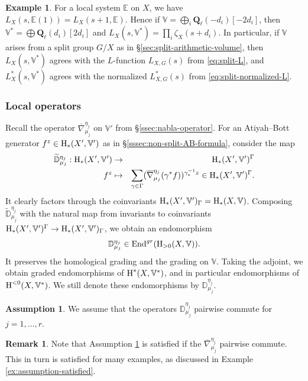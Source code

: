 \documentclass[reqno]{amsart}
\numberwithin{equation}{subsection}
\theoremstyle{definition}
\newtheorem{remark}[subsubsection]{Remark}
\newtheorem{exam}[subsubsection]{Example}
\newtheorem{assumption}[subsubsection]{Assumption}
\def\DD{\mathbb{D}}
\def\EE{\mathbb{E}}
\def\VV{\mathbb{V}}
\newcommand\End{\textup{End}}
\newcommand{\Ql}{\Q_{\ell}}
\newcommand{\wt}[1]{\widetilde{#1}}
\newcommand{\ov}{\overline}
\newcommand{\homog}[2]{\textup{H}_{#1}({#2})}  %
\newcommand{\cohog}[2]{\textup{H}^{#1}({#2})}     %
\newcommand\mt{\mapsto}
\newcommand\g\gamma
\newcommand\G\Gamma
\newcommand{\y}{\eta}
\newcommand\nb{\nabla}
\newcommand{\Q}{\mathbf{Q}}
\begin{document}
\begin{exam}
For a local system $\EE$ on $X$, we have $L_X(s, \EE(1))  = L_X(s+1, \EE)$. Hence if $\VV = \bigoplus_i \Ql(-d_i)[-2d_i]$, then $\VV^* = \bigoplus \Ql(d_i)[2d_i]$ and $L_X(s, \VV^*) = \prod_{i} \zeta_X(s+d_i)$. In particular, if $\VV$ arises from a split group $G/X$ as in \S \ref{sec:split-arithmetic-volume}, then $L_X(s, \VV^*)$ agrees with the $L$-function $L_{X,G}(s)$ from \eqref{eq:split-L}, and $L_X^*(s, \VV^*)$ agrees with the normalized $L^*_{X,G}(s)$ from \eqref{eq:split-normalized-L}.
\end{exam}

\subsubsection{Local operators}
Recall the operator $\ov\nb_{\mu_j}^{\y_{j}}$ on $\VV'$ from \S \ref{ssec:nabla-operator}. For an Atiyah--Bott generator $f^{z}\in \homog{*}{X',\VV'}$ as in \S \ref{sssec:non-split-AB-formula}, consider the map
\begin{eqnarray*}
\wt\DD^{\y_{j}}_{\mu_j}: \homog{*}{X',\VV'}
&\to& \homog{*}{X',\VV'}^{\G} \\
f^{z} & \mt &\sum_{\g\in \G} (\ov\nb^{\y_{j}}_{\mu_j}(\g^{*} f))^{\g^{-1}_{*}z} 
\in \homog{*}{X',\VV'}^{\G}.
\end{eqnarray*}
It clearly factors through the coinvariants $\homog{*}{X',\VV'}_{\G}=\homog{*}{X, \VV}$.  Composing $\wt\DD^{\y_{j}}_{\mu_j}$ with the natural map from invariants to coinvariants  $\homog{*}{X',\VV'}^{\G}\to \homog{*}{X',\VV'}_{\G}$, we obtain an endomorphism
\begin{equation*}
\DD^{\y_{j}}_{\mu_j}\in \End^{gr}(\homog{>0}{X,\VV}).
\end{equation*}
It preserves the homological grading and the grading on $\VV$. Taking the adjoint, we obtain graded endomorphisms of $\cohog{*}{X,\VV^{*}}$, and in particular endomorphisms of $\cohog{<0}{X,\VV^{*}}$. We still denote these endomorphisms by $\DD^{\y_{j}}_{\mu_j}$.

\begin{assumption}\label{assump:nonsplit-operators-commute}
We assume that the operators $\DD^{\y_{j}}_{\mu_j}$ pairwise commute for $j=1, \ldots, r$. 
\end{assumption}

\begin{remark}Note that Assumption \ref{assump:nonsplit-operators-commute} is satisfied if the $\ov \nabla^{\eta_j}_{\mu_j}$ pairwise commute. This in turn is satisfied for many examples, as discussed in Example \ref{ex:assumption-satisfied}.
\end{remark}
\end{document}
